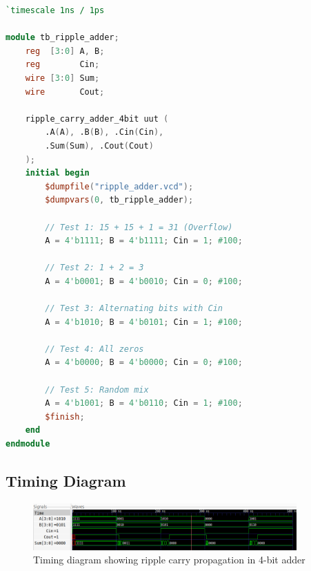 \documentclass{article}
\begin{document}
\begin{tcolorbox}[title=NAND Adder Testbench, breakable]

\begin{lstlisting}[language=Verilog]
`timescale 1ns / 1ps

module tb_ripple_adder;
    reg  [3:0] A, B;
    reg        Cin;
    wire [3:0] Sum;
    wire       Cout;

    ripple_carry_adder_4bit uut (
        .A(A), .B(B), .Cin(Cin),
        .Sum(Sum), .Cout(Cout)
    );
    initial begin
        $dumpfile("ripple_adder.vcd");
        $dumpvars(0, tb_ripple_adder);

        // Test 1: 15 + 15 + 1 = 31 (Overflow)
        A = 4'b1111; B = 4'b1111; Cin = 1; #100;

        // Test 2: 1 + 2 = 3
        A = 4'b0001; B = 4'b0010; Cin = 0; #100;

        // Test 3: Alternating bits with Cin
        A = 4'b1010; B = 4'b0101; Cin = 1; #100;

        // Test 4: All zeros
        A = 4'b0000; B = 4'b0000; Cin = 0; #100;

        // Test 5: Random mix
        A = 4'b1001; B = 4'b0110; Cin = 1; #100;
        $finish;
    end
endmodule
\end{lstlisting}
\end{tcolorbox}

\subsection{Timing Diagram}
\begin{figure}[H]
    \centering
    \includegraphics[width=0.9\textwidth]{4.png}
    \caption{Timing diagram showing ripple carry propagation in 4-bit adder}
    \label{fig:ripple_timing}
\end{figure}
\begin{center}
\end{center}
\end{document}
